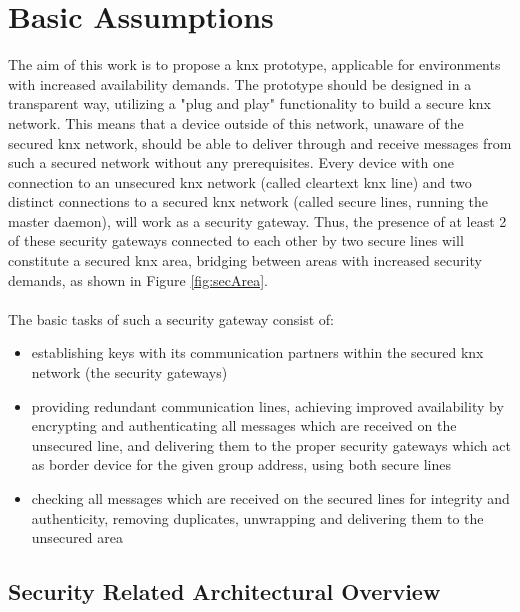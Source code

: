 \label{chap4}
\section{Basic Assumptions}

The aim of this work is to propose a \gls{knx} prototype, applicable for environments with increased availability demands.
The prototype should be designed in a transparent way, utilizing a "plug and play" functionality to build a secure \gls{knx} network.
This means that a device outside of this network, unaware of
the secured \gls{knx} network, should be able to deliver through and receive messages from such a secured network without any prerequisites. 
Every device with one connection to an unsecured \gls{knx} network (called cleartext \gls{knx} line) and two distinct connections to a secured \gls{knx}
network (called secure lines, running the master daemon), will work
as a security gateway. Thus, the presence of at least 2 of these security gateways connected to each other by two secure lines will constitute a 
secured \gls{knx} area, bridging between areas with increased security demands, as shown in Figure \ref{fig:secArea}.
\\
\\
The basic tasks of such a security gateway consist of:
\begin{itemize}
 \item establishing keys with its communication partners within the secured \gls{knx} network (the security gateways)
 \item providing redundant communication lines, achieving improved availability by encrypting and authenticating all messages which are received on the unsecured line, and delivering them to the proper security gateways which act as
 border device for the given group address, using both secure lines
 \item checking all messages which are received on the secured lines for integrity and authenticity, removing duplicates, unwrapping and delivering them to
 the unsecured area
\end{itemize}

\subsection{Security Related Architectural Overview}

